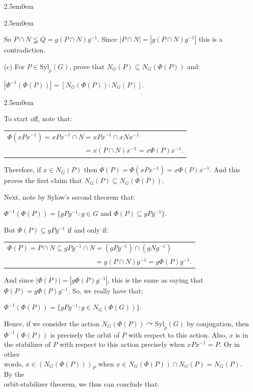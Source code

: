 \documentclass{book}
\newcommand{\HexOne}{%
   \color{Purple}%
   \fontsize{12}{13}\selectfont%
}
\newenvironment{myIndent}{%
   \begin{adjustwidth}{2.5em}{0em}%
}{%
   \end{adjustwidth}%
}
\newcommand{\Syl}{\mathrm{Syl}}
\newcommand{\retTwo}{\hfill\bigbreak}
\begin{document}
\begin{myIndent}
\begin{myIndent}
		So $P \cap N \lneqq Q = g(P \cap N)g^{-1}$. Since $|P \cap N| = |g(P \cap N)g^{-1}|$ this is a contradiction.\newpage
	\end{myIndent}

	\item[(c)] For $P \in \Syl_p(G)$, prove that $N_G(P) \subseteq N_G(\Phi(P))$ and:
	
	{\centering $|\Phi^{-1}(\Phi(P))| = [N_G(\Phi(P)) : N_G(P)]$. \retTwo\par}

	\begin{myIndent}\HexOne
		To start off, note that:
		
		{\centering\begin{tabular}{l}
			$\Phi(xPx^{-1}) = xPx^{-1} \cap N = xPx^{-1} \cap xNx^{-1}$\\
			$\phantom{\Phi(xPx^{-1}) = xPx^{-1} \cap N} = x(P \cap N)x^{-1} = x\Phi(P)x^{-1}$.
		\end{tabular}\retTwo\par}

		Therefore, if $x \in N_G(P)$ then $\Phi(P) = \Phi(xPx^{-1}) = x\Phi(P)x^{-1}$. And this proves the first claim that $N_G(P) \subseteq N_G(\Phi(P))$.\retTwo

		Next, note by Sylow's second theorem that:
		
		{\centering$\Phi^{-1}(\Phi(P)) = \{gPg^{-1} : g \in G \text{ and } \Phi(P) \subseteq gPg^{-1}\}$.\retTwo\par}

		But $\Phi(P) \subseteq gPg^{-1}$ if and only if:
		
		{\centering\begin{tabular}{l}
			$\Phi(P) = P \cap N \subseteq gPg^{-1} \cap N = (gPg^{-1}) \cap (gNg^{-1})$\\
			$\phantom{\Phi(P) = P \cap N \subseteq gPg^{-1} \cap N} = g(P \cap N)g^{-1} = g\Phi(P)g^{-1}$.
		\end{tabular}\retTwo\par}

		And since $|\Phi(P)| = |g\Phi(P)g^{-1}|$, this is the same as saying that $\Phi(P) = g\Phi(P)g^{-1}$. So, we really have that:

		{\centering$\Phi^{-1}(\Phi(P)) = \{gPg^{-1} : g \in N_G(\Phi(G))\}$.\retTwo\par}

		Hence, if we consider the action $N_G(\Phi(P)) \curvearrowright \Syl_p(G)$ by conjugation, then\\ [-1pt] $\Phi^{-1}(\Phi(P))$ is precisely the orbit of $P$ with respect to this action. Also, $x$ is in the stabilizer of $P$ with respect to this action precisely when $xPx^{-1} = P$. Or in other\\ words, $x \in (N_G(\Phi(P)))_P$ when $x \in N_G(\Phi(P)) \cap N_G(P) = N_G(P)$. By the\\ orbit-stabilizer theorem, we thus can conclude that:
		

\end{myIndent}
\end{myIndent}
\end{document}
